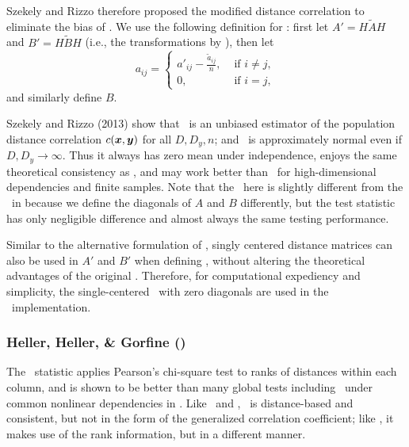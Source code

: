 \documentclass[11pt]{extarticle}
\begin{document}
Szekely and Rizzo \cite{SzekelyRizzo2013a, SzekelyRizzo2014, RizzoSzekely2016} therefore proposed the modified distance correlation to eliminate the bias of \Dcorr. We use the following definition for \Mcorr: first let $A'=H\tilde{A}H$ and $B'=H\tilde{B}H$ (i.e., the transformations by \Dcorr), then let
\[a_{ij} = \left\{
  \begin{array}{lr}
    a'_{ij}-\frac{\tilde{a}_{ij}}{n}, & \mbox{ if } i \neq j, \\
    0, &\mbox{ if } i = j,
  \end{array}
\right.
\]
and similarly define $B$.

Szekely and Rizzo (2013) \cite{SzekelyRizzo2013a} show that
\Mcorr~is an unbiased estimator of the population distance correlation $c(\boldsymbol{x},\boldsymbol{y})$ for all $D, D_y, n$; and \Mcorr~is approximately normal even if $D,D_y \rightarrow \infty$. Thus it always has zero mean under independence, enjoys the same theoretical consistency as \Dcorr, and may work better than \Dcorr~for high-dimensional dependencies and finite samples. Note that the \Mcorr~here is slightly different from the \Mcorr~in \cite{SzekelyRizzo2013a} because we define the diagonals of $A$ and $B$ differently, but the test statistic has only negligible difference and almost always the same testing performance.

Similar to the alternative formulation of \Dcorr, singly centered distance matrices can also be used in $A'$ and $B'$ when defining \Mcorr, without altering the theoretical advantages of the original \Mcorr.
Therefore, for computational expediency and simplicity, the single-centered \Mcorr~with zero diagonals are used in the \Mgc~implementation.

\subsubsection{Heller, Heller, \& Gorfine (\Hhg)}
\label{appen:hhg}

The \Hhg~statistic applies Pearson's chi-square test to ranks of distances within each column, and is shown to be better than many global tests including \Dcorr~under common nonlinear dependencies in \cite{GorfineHellerHeller2012, HellerGorfine2013}. Like \Dcorr~and \Mcorr, \Hhg~is distance-based and consistent, but not in the form of the generalized correlation coefficient;
like \Mgc, it makes use of the rank information, but in a different manner.
\end{document}
